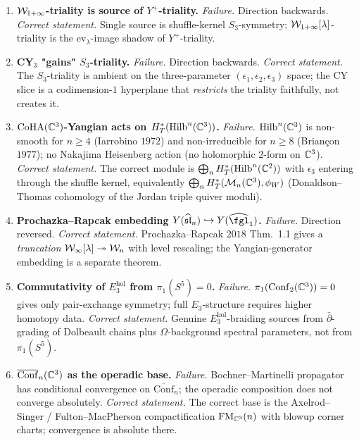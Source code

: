\begin{theorem}
\begin{enumerate}
\item \textbf{$\mathcal{W}_{1+\infty}$-triality is source of $Y^+$-triality.}
\emph{Failure.} Direction backwards.
\emph{Correct statement.} Single source is shuffle-kernel $S_3$-symmetry;
$\mathcal{W}_{1+\infty}[\lambda]$-triality is the $\mathrm{ev}_\lambda$-image shadow
of $Y^+$-triality.

\item \textbf{CY$_3$ "gains" $S_3$-triality.}
\emph{Failure.} Direction backwards.
\emph{Correct statement.} The $S_3$-triality is ambient on the three-parameter
$(\epsilon_1, \epsilon_2, \epsilon_3)$ space; the CY slice is a
codimension-$1$ hyperplane that \emph{restricts} the triality
faithfully, not creates it.

\item \textbf{$\mathrm{CoHA}(\mathbb{C}^3)$-Yangian acts on $H^*_T(\mathrm{Hilb}^n
(\mathbb{C}^3))$.}
\emph{Failure.} $\mathrm{Hilb}^n(\mathbb{C}^3)$ is non-smooth for $n \geq 4$
(Iarrobino $1972$) and non-irreducible for $n \geq 8$
(Brian\c con $1977$); no Nakajima Heisenberg action (no holomorphic
$2$-form on $\mathbb{C}^3$).
\emph{Correct statement.} The correct module is
$\bigoplus_n H^*_T(\mathrm{Hilb}^n(\mathbb{C}^2))$ with $\epsilon_3$ entering
through the shuffle kernel, equivalently
$\bigoplus_n H^*_T(\mathcal{M}_n(\mathbb{C}^3), \phi_W)$ (Donaldson--Thomas cohomology
of the Jordan triple quiver moduli).

\item \textbf{Prochazka--Rapcak embedding
$Y(\widehat{\mathfrak{sl}}_n) \hookrightarrow Y(\widehat{\fgl}_1)$.}
\emph{Failure.} Direction reversed.
\emph{Correct statement.} Prochazka--Rapcak $2018$ Thm.~1.1 gives a
\emph{truncation} $\mathcal{W}_\infty[\lambda] \twoheadrightarrow \mathcal{W}_n$
with level rescaling; the Yangian-generator embedding is a separate
theorem.

\item \textbf{Commutativity of $E_3^{\mathrm{hol}}$ from
$\pi_1(S^5) = 0$.}
\emph{Failure.} $\pi_1(\mathrm{Conf}_2(\mathbb{C}^3)) = 0$ gives only
pair-exchange symmetry; full $E_3$-structure requires higher homotopy
data.
\emph{Correct statement.} Genuine $E_3^{\mathrm{hol}}$-braiding sources from
$\bar\partial$-grading of Dolbeault chains plus $\Omega$-background
spectral parameters, not from $\pi_1(S^5)$.

\item \textbf{$\overline{\mathrm{Conf}}_n(\mathbb{C}^3)$ as the operadic
base.}
\emph{Failure.} Bochner--Martinelli propagator has conditional
convergence on $\overline{\mathrm{Conf}}_n$; the operadic composition
does not converge absolutely.
\emph{Correct statement.} The correct base is the Axelrod--Singer /
Fulton--MacPherson compactification $\mathrm{FM}_{\mathbb{C}^3}(n)$ with blowup corner
charts; convergence is absolute there.


\end{enumerate}
\end{theorem}
